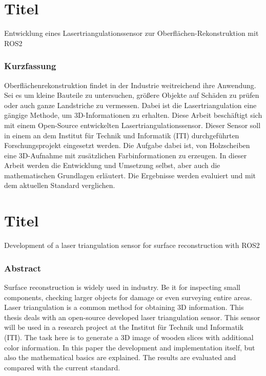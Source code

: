 \section*{Titel}
Entwicklung eines Lasertriangulationssensor zur Oberflächen-Rekonstruktion mit ROS2
\vfill
\subsubsection*{Kurzfassung}

Oberflächenrekonstruktion findet in der Industrie weitreichend ihre Anwendung. Sei es um kleine Bauteile zu untersuchen, größere Objekte auf Schäden zu prüfen oder auch ganze Landstriche zu vermessen. Dabei ist die Lasertriangulation eine gängige Methode, um 3D-Informationen zu erhalten. Diese Arbeit beschäftigt sich mit einem Open-Source entwickelten Lasertriangulationssensor. Dieser Sensor soll in einem an dem Institut für Technik und Informatik (ITI) durchgeführten Forschungsprojekt eingesetzt werden. Die Aufgabe dabei ist, von Holzscheiben eine 3D-Aufnahme mit zusätzlichen Farbinformationen zu erzeugen. In dieser Arbeit werden die Entwicklung und Umsetzung selbst, aber auch die mathematischen Grundlagen erläutert. Die Ergebnisse werden evaluiert und mit dem aktuellen Standard verglichen.

\section*{Titel}
Development of a laser triangulation sensor for surface reconstruction with ROS2

\vfill
\subsubsection*{Abstract}

Surface reconstruction is widely used in industry. Be it for inspecting small components, checking larger objects for damage or even surveying entire areas. Laser triangulation is a common method for obtaining 3D information. This thesis deals with an open-source developed laser triangulation sensor. This sensor will be used in a research project at the Institut für Technik und Informatik (ITI). The task here is to generate a 3D image of wooden slices with additional color information. In this paper the development and implementation itself, but also the mathematical basics are explained. The results are evaluated and compared with the current standard.

